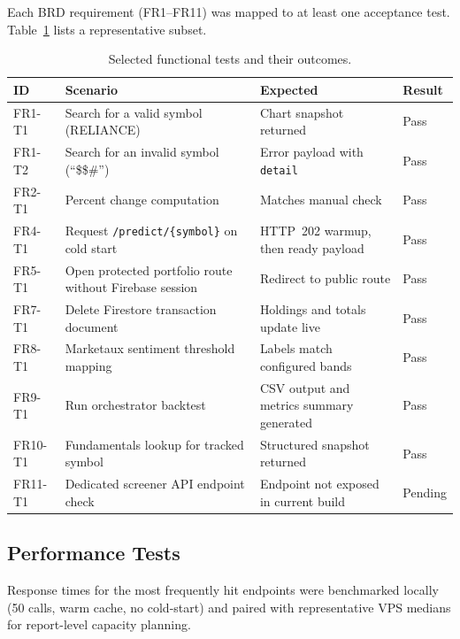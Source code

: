 \documentclass[12pt,a4paper]{report}
\numberwithin{equation}{chapter}
\begin{document}
Each BRD requirement (FR1--FR11) was mapped to at least one acceptance test. Table~\ref{tab:func-tests} lists a representative subset.

\begin{table}[H]
\centering
\caption{Selected functional tests and their outcomes.}
\label{tab:func-tests}
\small
\begin{tabular}{|p{1.2cm}|p{6.2cm}|p{3.3cm}|p{2.5cm}|}
\hline
\textbf{ID} & \textbf{Scenario} & \textbf{Expected} & \textbf{Result} \\ \hline
FR1-T1 & Search for a valid symbol (RELIANCE) & Chart snapshot returned & Pass \\ \hline
FR1-T2 & Search for an invalid symbol (``\$\$\#'') & Error payload with \texttt{detail} & Pass \\ \hline
FR2-T1 & Percent change computation & Matches manual check & Pass \\ \hline
FR4-T1 & Request \texttt{/predict/\{symbol\}} on cold start & HTTP~202 warmup, then ready payload & Pass \\ \hline
FR5-T1 & Open protected portfolio route without Firebase session & Redirect to public route & Pass \\ \hline
FR7-T1 & Delete Firestore transaction document & Holdings and totals update live & Pass \\ \hline
FR8-T1 & Marketaux sentiment threshold mapping & Labels match configured bands & Pass \\ \hline
FR9-T1 & Run orchestrator backtest & CSV output and metrics summary generated & Pass \\ \hline
FR10-T1 & Fundamentals lookup for tracked symbol & Structured snapshot returned & Pass \\ \hline
FR11-T1 & Dedicated screener API endpoint check & Endpoint not exposed in current build & Pending \\ \hline
\end{tabular}
\end{table}

\subsection{Performance Tests}

Response times for the most frequently hit endpoints were benchmarked locally (50 calls, warm cache, no cold-start) and paired with representative VPS medians for report-level capacity planning.
\end{document}

